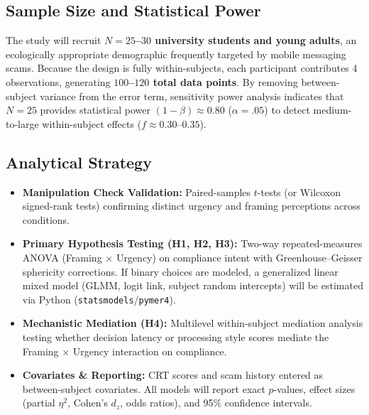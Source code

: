\documentclass[11pt]{article}
\begin{document}
\subsection{Sample Size and Statistical Power}
The study will recruit \textbf{$N = 25$--$30$ university students and young adults}, an ecologically appropriate demographic frequently targeted by mobile messaging scams. Because the design is fully within-subjects, each participant contributes 4 observations, generating \textbf{$100$--$120$ total data points}. By removing between-subject variance from the error term, sensitivity power analysis indicates that $N = 25$ provides statistical power $(1 - \beta) \approx 0.80$ ($\alpha = .05$) to detect medium-to-large within-subject effects ($f \approx 0.30$--$0.35$).

\subsection{Analytical Strategy}
\begin{itemize}[leftmargin=*]
    \item \textbf{Manipulation Check Validation:} Paired-samples $t$-tests (or Wilcoxon signed-rank tests) confirming distinct urgency and framing perceptions across conditions.
    \item \textbf{Primary Hypothesis Testing (H1, H2, H3):} Two-way repeated-measures ANOVA (Framing $\times$ Urgency) on compliance intent with Greenhouse--Geisser sphericity corrections. If binary choices are modeled, a generalized linear mixed model (GLMM, logit link, subject random intercepts) will be estimated via Python (\texttt{statsmodels}/\texttt{pymer4}).
    \item \textbf{Mechanistic Mediation (H4):} Multilevel within-subject mediation analysis testing whether decision latency or processing style scores mediate the Framing $\times$ Urgency interaction on compliance.
    \item \textbf{Covariates \& Reporting:} CRT scores and scam history entered as between-subject covariates. All models will report exact $p$-values, effect sizes (partial $\eta^2$, Cohen's $d_z$, odds ratios), and 95\% confidence intervals.
\end{itemize}
\end{document}
